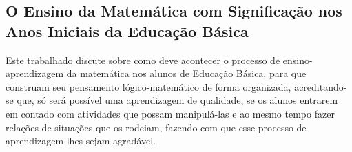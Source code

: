 \documentclass[12pt,a4paper]{article}
\begin{document}

\subsection{O Ensino da Matemática com Significação nos Anos Iniciais da Educação Básica}
Este trabalhado discute sobre como deve acontecer o processo de ensino-aprendizagem da matemática nos alunos de Educação Básica, para que construam seu pensamento lógico-matemático de forma organizada, acreditando-se que, só será possível uma aprendizagem de qualidade, se os alunos entrarem em contado com atividades que possam manipulá-las e ao mesmo tempo fazer relações de situações que os rodeiam, fazendo com que esse processo de aprendizagem lhes sejam agradável. 
\end{document}
